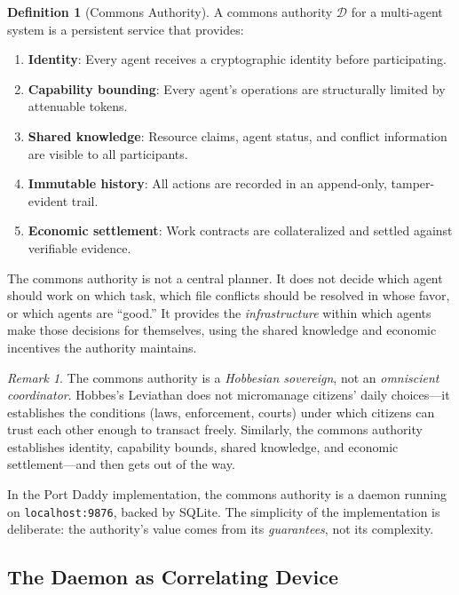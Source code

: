 \documentclass[11pt,a4paper]{article}
\theoremstyle{definition}
\newtheorem{definition}{Definition}[section]
\theoremstyle{remark}
\newtheorem*{remark}{Remark}
\begin{document}
\begin{definition}[Commons Authority]\label{def:commons}
A commons authority $\mathcal{D}$ for a multi-agent system is a persistent service that provides:
\begin{enumerate}[nosep]
  \item \textbf{Identity}: Every agent receives a cryptographic identity before participating.
  \item \textbf{Capability bounding}: Every agent's operations are structurally limited by attenuable tokens.
  \item \textbf{Shared knowledge}: Resource claims, agent status, and conflict information are visible to all participants.
  \item \textbf{Immutable history}: All actions are recorded in an append-only, tamper-evident trail.
  \item \textbf{Economic settlement}: Work contracts are collateralized and settled against verifiable evidence.
\end{enumerate}
The commons authority is not a central planner. It does not decide which agent should work on which task, which file conflicts should be resolved in whose favor, or which agents are ``good.'' It provides the \emph{infrastructure} within which agents make those decisions for themselves, using the shared knowledge and economic incentives the authority maintains.
\end{definition}

\begin{remark}
The commons authority is a \emph{Hobbesian sovereign}, not an \emph{omniscient coordinator}. Hobbes's Leviathan does not micromanage citizens' daily choices---it establishes the conditions (laws, enforcement, courts) under which citizens can trust each other enough to transact freely. Similarly, the commons authority establishes identity, capability bounds, shared knowledge, and economic settlement---and then gets out of the way.
\end{remark}

In the Port Daddy implementation, the commons authority is a daemon running on \texttt{localhost:9876}, backed by SQLite. The simplicity of the implementation is deliberate: the authority's value comes from its \emph{guarantees}, not its complexity.

\subsection{The Daemon as Correlating Device}\label{sec:correlating-device}
\end{document}

